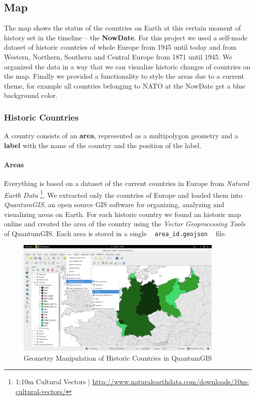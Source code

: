 \subsection{Map}
The map shows the status of the countries on Earth at this certain moment of history set in the timeline -- the \textbf{NowDate}. For this project we used a self-made dataset of historic countries of whole Europe from 1945 until today and from Western, Northern, Southern and Central Europe from 1871 until 1945. We organized the data in a way that we can visualize historic changes of countries on the map. Finally we provided a functionality to style the areas due to a current theme, for example all countries belonging to NATO at the NowDate get a blue background color.

\subsubsection{Historic Countries} %
\label{ssub:historic_countries}

A country consists of an \textbf{area}, represented as a multipolygon geometry and a \textbf{label} with the name of the country and the position of the label.

\paragraph{Areas}
Everything is based on a dataset of the current countries in Europe from \textit{Natural Earth Data}
\footnote{1:10m Cultural Vectors | \url{http://www.naturalearthdata.com/downloads/10m-cultural-vectors/}}.
We extracted only the countries of Europe and loaded them into \textit{QuantumGIS}, an open source GIS software for organizing, analyzing and visualizing areas on Earth. For each historic country we found an historic map online and created the area of the country using the \textit{Vector Geoprocessing Tools} of QuantumGIS. Each area is stored in a single ~ \texttt{area\_id.geojson} ~ file.

\begin{figure}[H]
  \begin{center}
    \includegraphics[width=0.9\textwidth]{graphics/qgis.png}
  \end{center}
  \caption{Geometry Manipulation of Historic Countries in QuantumGIS}
  \label{fig:qgis}
\end{figure}
\label{par:area}

